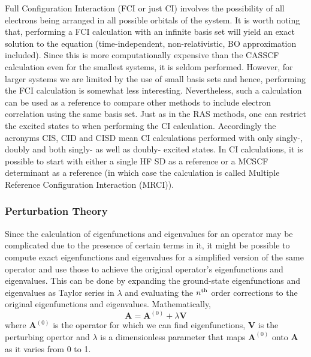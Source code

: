             Full Configuration Interaction (FCI or just CI) involves the possibility of all electrons being arranged in all possible orbitals of the system. It is worth noting that, performing a FCI calculation with an infinite basis set will yield an exact solution to the \Schrodinger{} equation (time-independent, non-relativistic, BO approximation included). Since this is more computationally expensive than the CASSCF calculation even for the smallest systems, it is seldom performed. However, for larger systems we are limited by the use of small basis sets and hence, performing the FCI calculation is somewhat less interesting. Nevertheless, such a calculation can be used as a reference to compare other methods to include electron correlation using the same basis set. Just as in the RAS methods, one can restrict the excited states to when performing the CI calculation. Accordingly the acronyms CIS, CID and CISD mean CI calculations performed with only singly-, doubly and both singly- as well as doubly- excited states. In CI calculations, it is possible to start with either a single HF SD as a reference or a MCSCF determinant as a reference (in which case the calculation is called Multiple Reference Configuration Interaction (MRCI)).

            \subsubsection{Perturbation Theory}
                Since the calculation of eigenfunctions and eigenvalues for an operator may be complicated due to the presence of certain terms in it, it might be possible to compute exact eigenfunctions and eigenvalues for a simplified version of the same operator and use those to achieve the original operator's eigenfunctions and eigenvalues. This can be done by expanding the ground-state eigenfunctions and eigenvalues as Taylor series in $\lambda$ and evaluating the $n^{\rm th}$ order corrections to the original eigenfunctions and eigenvalues. Mathematically,
                \begin{equation}\label{eq:perturbation theory}
                    \mathbf{A} = \mathbf{A}^{(0)} + \lambda \mathbf{V}
                \end{equation}
                where $\mathbf{A}^{(0)}$ is the operator for which we can find eigenfunctions, $\mathbf{V}$ is the perturbing opertor and $\lambda$ is a dimensionless parameter that maps $\mathbf{A}^{(0)}$ onto $\mathbf{A}$ as it varies from 0 to 1.

